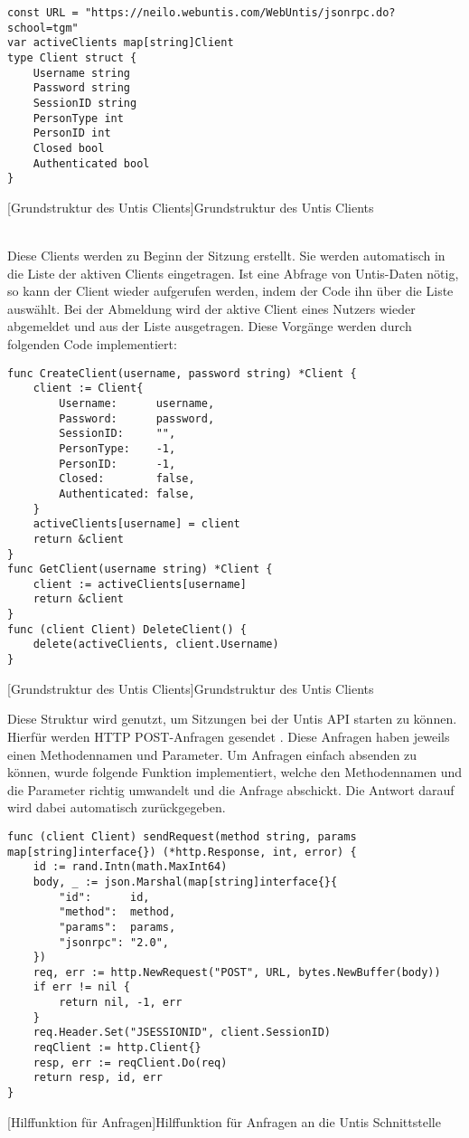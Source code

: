 \begin{verbatim}
const URL = "https://neilo.webuntis.com/WebUntis/jsonrpc.do?school=tgm"
var activeClients map[string]Client
type Client struct {
	Username string
	Password string
	SessionID string
	PersonType int
	PersonID int
	Closed bool
	Authenticated bool
}
\end{verbatim}
[Grundstruktur des Untis Clients]{Grundstruktur des Untis Clients}

~\\ Diese Clients werden zu Beginn der Sitzung erstellt. Sie werden automatisch in die Liste der aktiven Clients eingetragen. Ist eine Abfrage von Untis-Daten nötig, so kann der Client wieder aufgerufen werden, indem der Code ihn über die Liste auswählt. Bei der Abmeldung wird der aktive Client eines Nutzers wieder abgemeldet und aus der Liste ausgetragen. Diese Vorgänge werden durch folgenden Code implementiert: 

\begin{verbatim}
func CreateClient(username, password string) *Client {
	client := Client{
		Username:      username,
		Password:      password,
		SessionID:     "",
		PersonType:    -1,
		PersonID:      -1,
		Closed:        false,
		Authenticated: false,
	}
	activeClients[username] = client
	return &client
}
func GetClient(username string) *Client {
	client := activeClients[username]
	return &client
}
func (client Client) DeleteClient() {
	delete(activeClients, client.Username)
}
\end{verbatim}
[Grundstruktur des Untis Clients]{Grundstruktur des Untis Clients}

Diese Struktur wird genutzt, um Sitzungen bei der Untis API starten zu können. Hierfür werden HTTP POST-Anfragen gesendet \cite{untis}. Diese Anfragen haben jeweils einen Methodennamen und Parameter. Um Anfragen einfach absenden zu können, wurde folgende Funktion implementiert, welche den Methodennamen und die Parameter richtig umwandelt und die Anfrage abschickt. Die Antwort darauf wird dabei automatisch zurückgegeben.
 
\begin{verbatim}
func (client Client) sendRequest(method string, params map[string]interface{}) (*http.Response, int, error) {
	id := rand.Intn(math.MaxInt64)
	body, _ := json.Marshal(map[string]interface{}{
		"id":      id,
		"method":  method,
		"params":  params,
		"jsonrpc": "2.0",
	})
	req, err := http.NewRequest("POST", URL, bytes.NewBuffer(body))
	if err != nil {
		return nil, -1, err
	}
	req.Header.Set("JSESSIONID", client.SessionID)
	reqClient := http.Client{}
	resp, err := reqClient.Do(req)
	return resp, id, err
}
\end{verbatim}
[Hilffunktion für Anfragen]{Hilffunktion für Anfragen an die Untis Schnittstelle \cite{untis}}

